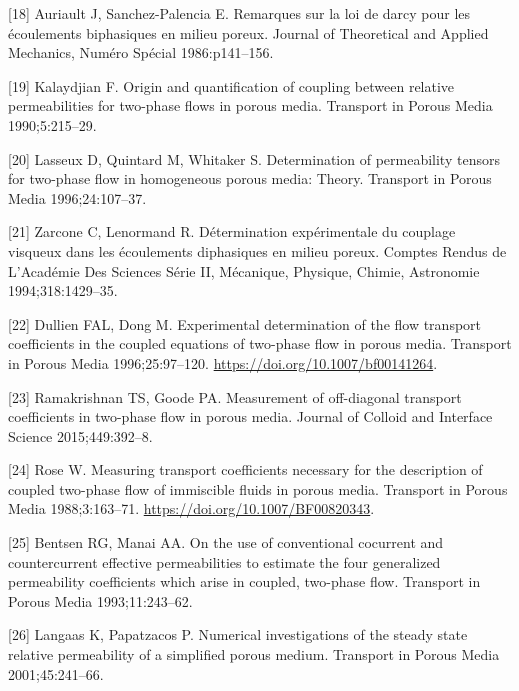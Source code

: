 \documentclass[]{article}
\begin{document}
\leavevmode\hypertarget{ref-auriault1986remarques}{}%
{[}18{]} Auriault J, Sanchez-Palencia E. Remarques sur la loi de darcy
pour les écoulements biphasiques en milieu poreux. Journal of
Theoretical and Applied Mechanics, Numéro Spécial 1986:p141--156.

\leavevmode\hypertarget{ref-kalaydjian1990origin}{}%
{[}19{]} Kalaydjian F. Origin and quantification of coupling between
relative permeabilities for two-phase flows in porous media. Transport
in Porous Media 1990;5:215--29.

\leavevmode\hypertarget{ref-Lasseux1996}{}%
{[}20{]} Lasseux D, Quintard M, Whitaker S. Determination of
permeability tensors for two-phase flow in homogeneous porous media:
Theory. Transport in Porous Media 1996;24:107--37.

\leavevmode\hypertarget{ref-zarcone1994determination}{}%
{[}21{]} Zarcone C, Lenormand R. Détermination expérimentale du couplage
visqueux dans les écoulements diphasiques en milieu poreux. Comptes
Rendus de L'Académie Des Sciences Série II, Mécanique, Physique, Chimie,
Astronomie 1994;318:1429--35.

\leavevmode\hypertarget{ref-Dullien1996}{}%
{[}22{]} Dullien FAL, Dong M. Experimental determination of the flow
transport coefficients in the coupled equations of two-phase flow in
porous media. Transport in Porous Media 1996;25:97--120.
\url{https://doi.org/10.1007/bf00141264}.

\leavevmode\hypertarget{ref-ramakrishnan2015measurement}{}%
{[}23{]} Ramakrishnan TS, Goode PA. Measurement of off-diagonal
transport coefficients in two-phase flow in porous media. Journal of
Colloid and Interface Science 2015;449:392--8.

\leavevmode\hypertarget{ref-Rose1988}{}%
{[}24{]} Rose W. Measuring transport coefficients necessary for the
description of coupled two-phase flow of immiscible fluids in porous
media. Transport in Porous Media 1988;3:163--71.
\url{https://doi.org/10.1007/BF00820343}.

\leavevmode\hypertarget{ref-bentsen1993use}{}%
{[}25{]} Bentsen RG, Manai AA. On the use of conventional cocurrent and
countercurrent effective permeabilities to estimate the four generalized
permeability coefficients which arise in coupled, two-phase flow.
Transport in Porous Media 1993;11:243--62.

\leavevmode\hypertarget{ref-langaas2001numerical}{}%
{[}26{]} Langaas K, Papatzacos P. Numerical investigations of the steady
state relative permeability of a simplified porous medium. Transport in
Porous Media 2001;45:241--66.
\end{document}
